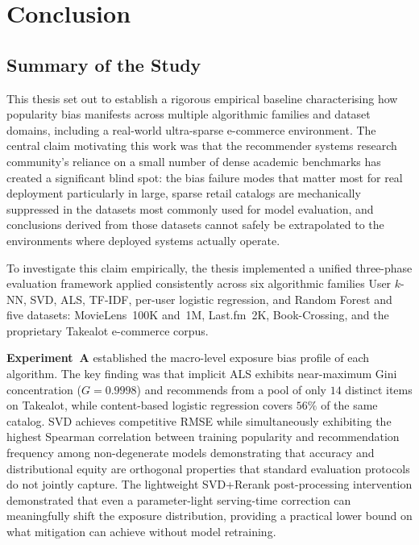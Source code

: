 \documentclass[11pt,a4paper]{report}
\begin{document}

\chapter{Conclusion}
\label{ch:conclusion_final}

\section{Summary of the Study}
\label{sec:conc_summary}

This thesis set out to establish a rigorous empirical baseline characterising how popularity bias manifests across multiple algorithmic families and dataset domains, including a real-world ultra-sparse e-commerce environment. The central claim motivating this work was that the recommender systems research community's reliance on a small number of dense academic benchmarks has created a significant blind spot: the bias failure modes that matter most for real deployment particularly in large, sparse retail catalogs are mechanically suppressed in the datasets most commonly used for model evaluation, and conclusions derived from those datasets cannot safely be extrapolated to the environments where deployed systems actually operate.

To investigate this claim empirically, the thesis implemented a unified three-phase evaluation framework applied consistently across six algorithmic families User $k$-NN, SVD, ALS, TF-IDF, per-user logistic regression, and Random Forest and five datasets: MovieLens~100K and~1M, Last.fm~2K, Book-Crossing, and the proprietary Takealot e-commerce corpus.

\textbf{Experiment~A} established the macro-level exposure bias profile of each algorithm. The key finding was that implicit ALS exhibits near-maximum Gini concentration ($G = 0.9998$) and recommends from a pool of only $14$ distinct items on Takealot, while content-based logistic regression covers $56\%$ of the same catalog. SVD achieves competitive RMSE while simultaneously exhibiting the highest Spearman correlation between training popularity and recommendation frequency among non-degenerate models demonstrating that accuracy and distributional equity are orthogonal properties that standard evaluation protocols do not jointly capture. The lightweight SVD+Rerank post-processing intervention demonstrated that even a parameter-light serving-time correction can meaningfully shift the exposure distribution, providing a practical lower bound on what mitigation can achieve without model retraining.
\end{document}
